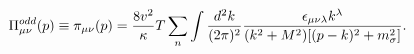 \begin{equation}\label{eq.01}
\Pi_{\mu \nu}^{odd} (p)\equiv {\cal{\pi}}_{\mu \nu} (p) =\frac{8 v^2}{\kappa} T \sum_{n} \int \frac{d^2
k}{(2 \pi)^2} \frac{\epsilon_{\mu \nu\lambda} k^{\lambda}}{(k^2 +
M^2)[(p-k)^2 + m^2_{\sigma}]}. 
\end{equation}

